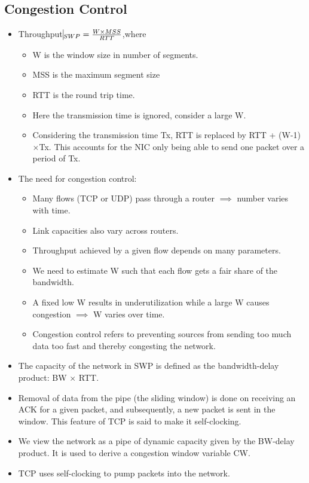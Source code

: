 \documentclass{report}
\begin{document}
\subsection{Congestion Control}
\begin{itemize}
\item Throughput$\vline_{SWP} = \frac{W\times MSS}{RTT}$,where
\begin{itemize}
    \item W is the window size in number of segments.
    \item MSS is the maximum segment size
    \item RTT is the round trip time.
    \item Here the transmission time is ignored, consider a large W.
    \item Considering the transmission time Tx, RTT is replaced by RTT + (W-1)$\times$Tx. This accounts for the NIC only being able to send one packet over a period of Tx.
\end{itemize}
\item The need for congestion control:
\begin{itemize}
\item Many flows (TCP or UDP) pass through a router $\implies$ number varies with time.
\item Link capacities also vary across routers.
\item Throughput achieved by a given flow depends on many parameters.
\item We need to estimate W such that each flow gets a fair share of the bandwidth.
\item A fixed low W results in underutilization while a large W causes congestion $\implies$ W varies over time.
\item Congestion control refers to preventing sources from sending too much data too fast and thereby congesting the network.
\end{itemize}
\item The capacity of the network in SWP is defined as the bandwidth-delay product: BW $\times$ RTT.
\item Removal of data from the pipe (the sliding window) is done on receiving an ACK for a given packet, and subsequently, a new packet is sent in the window. This feature of TCP is said to make it self-clocking.
\item We view the network as a pipe of dynamic capacity given by the BW-delay product. It is used to derive a congestion window variable CW.
\item TCP uses self-clocking to pump packets into the network.
\end{itemize}
\end{document}
